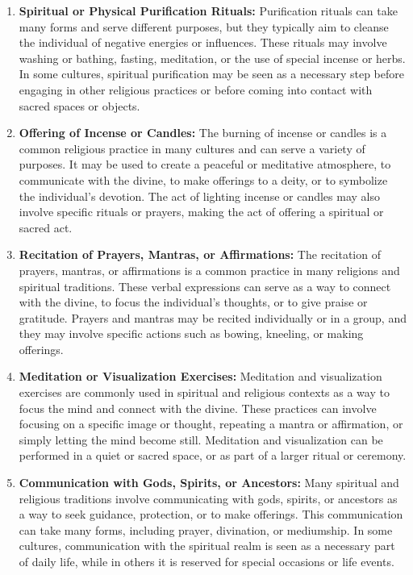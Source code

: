 \documentclass[12pt]{book}  %
\begin{document}
\begin{enumerate}
    \item \textbf{Spiritual or Physical Purification Rituals:}
    Purification rituals can take many forms and serve different purposes, but they typically aim to cleanse the individual of negative energies or influences. These rituals may involve washing or bathing, fasting, meditation, or the use of special incense or herbs. In some cultures, spiritual purification may be seen as a necessary step before engaging in other religious practices or before coming into contact with sacred spaces or objects.
    
    \item \textbf{Offering of Incense or Candles:}
    The burning of incense or candles is a common religious practice in many cultures and can serve a variety of purposes. It may be used to create a peaceful or meditative atmosphere, to communicate with the divine, to make offerings to a deity, or to symbolize the individual's devotion. The act of lighting incense or candles may also involve specific rituals or prayers, making the act of offering a spiritual or sacred act.
    
    \item \textbf{Recitation of Prayers, Mantras, or Affirmations:}
    The recitation of prayers, mantras, or affirmations is a common practice in many religions and spiritual traditions. These verbal expressions can serve as a way to connect with the divine, to focus the individual's thoughts, or to give praise or gratitude. Prayers and mantras may be recited individually or in a group, and they may involve specific actions such as bowing, kneeling, or making offerings.
    
    \item \textbf{Meditation or Visualization Exercises:}
    Meditation and visualization exercises are commonly used in spiritual and religious contexts as a way to focus the mind and connect with the divine. These practices can involve focusing on a specific image or thought, repeating a mantra or affirmation, or simply letting the mind become still. Meditation and visualization can be performed in a quiet or sacred space, or as part of a larger ritual or ceremony.

    \item \textbf{Communication with Gods, Spirits, or Ancestors:}
    Many spiritual and religious traditions involve communicating with gods, spirits, or ancestors as a way to seek guidance, protection, or to make offerings. This communication can take many forms, including prayer, divination, or mediumship. In some cultures, communication with the spiritual realm is seen as a necessary part of daily life, while in others it is reserved for special occasions or life events.


\end{enumerate}
\end{document}
